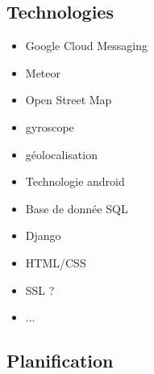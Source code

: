 \documentclass[french]{article}
\begin{document}
		\subsection{Technologies}
			\begin{itemize}
				\item Google Cloud Messaging
				\item Meteor
				\item Open Street Map
				\item gyroscope
				\item géolocalisation
				\item Technologie android
				\item Base de donnée SQL
				\item Django
				\item HTML/CSS
				\item SSL ?
				\item ...
			\end{itemize}
		
		\subsection{Planification}
	
\end{document}
